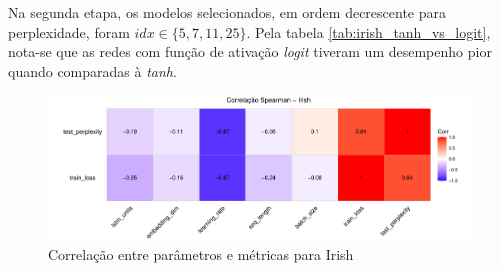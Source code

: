 \documentclass{automatextcc}
\begin{document}
Na segunda etapa, os modelos selecionados, em ordem decrescente para perplexidade, foram $idx \in \{5,7,11,25\}$. Pela tabela \ref{tab:irish_tanh_vs_logit}, nota-se que as redes com função de ativação \textit{logit} tiveram um desempenho pior quando comparadas à \textit{tanh}.

\begin{figure}[H]
    \centering
    \includegraphics[width=\textwidth]{irish_tanh_corr.pdf}
    \caption{Correlação entre parâmetros e métricas para Irish}
    \label{fig:irish_tanh_corr}
\end{figure}
\end{document}

